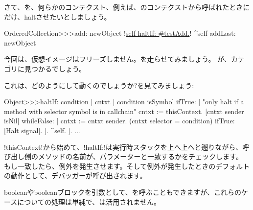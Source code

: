 \documentclass[a4paper,10pt,twoside]{book}
\begin{document}
さて、を、何らかのコンテクスト、例えば、のコンテクストから呼ばれたときにだけ、haltさせたいとしましょう。

\begin{code}{}
OrderedCollection>>>add: newObject
	!\underline{self haltIf: \#testAdd.}!
	^self addLast: newObject
\end{code}

今回は、仮想イメージはフリーズしません。を走らせてみましょう。
が、カテゴリに見つかるでしょう。

これは、どのようにして動くのでしょうか?を見てみましょう:
\begin{code}{}
Object>>>haltIf: condition
	| cntxt |
	condition isSymbol ifTrue: [
		"only halt if a method with selector symbol is in callchain"
		cntxt := thisContext.
		[cntxt sender isNil] whileFalse: [
			cntxt := cntxt sender. 
			(cntxt selector = condition) ifTrue: [Halt signal]. ].
		^self.
	].
	...
\end{code}

\ct!thisContext!から始めて、\ct!haltIf:!は実行時スタックを上へ上へと遡りながら、呼び出し側のメソッドの名前が、パラメーターと一致するかをチェックします。
もし一致したら、例外を発生させます。そして例外が発生したときのデフォルトの動作として、デバッガーが呼び出されます。

booleanやbooleanブロックを引数として、を呼ぶこともできますが、これらのケースについての処理は単純で、は活用されません。
\end{document}
